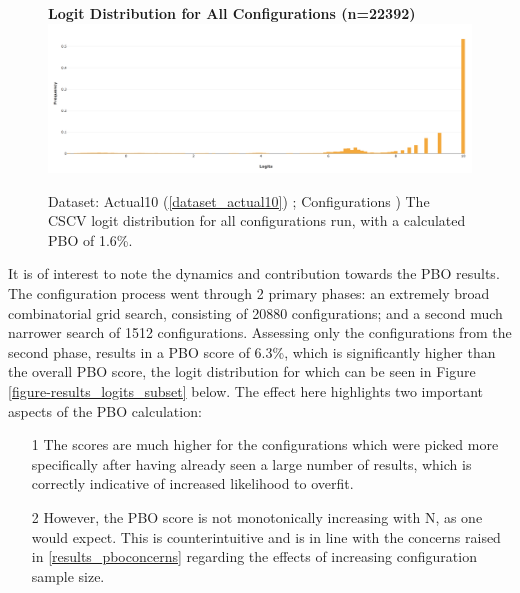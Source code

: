 \documentclass[a4paper,11pt,oneside]{article}
\theoremstyle{plain}
\theoremstyle{definition}
\begin{document}

\begin{figure}[H]
	\centering 
	\textbf{Logit Distribution for All Configurations (n=22392)}
	\includegraphics[scale=0.25]{images/results/pbo/all_sets_dist.png} 
	\caption{Dataset: Actual10 (\ref{dataset_actual10}) ; Configurations )
		\newline The CSCV logit distribution for all configurations run, with a calculated PBO of 1.6\%.}
	\label{figure-results_logits_all}
\end{figure}


It is of interest to note the dynamics and contribution towards the PBO results. The configuration process went through 2 primary phases: an extremely broad combinatorial grid search, consisting of 20880 configurations; and a second much narrower search of 1512 configurations. Assessing only the configurations from the second phase, results in a PBO score of 6.3\%, which is significantly higher than the overall PBO score, the logit distribution for which can be seen in Figure \ref{figure-results_logits_subset} below. The effect here highlights two important aspects of the PBO calculation:
\begin{itemize}
	\item[1] The scores are much higher for the configurations which were picked more specifically after having already seen a large number of results, which is correctly indicative of increased likelihood to overfit.
	\item[2] However, the PBO score is not monotonically increasing with N, as one would expect. This is counterintuitive and is in line with the concerns raised in \ref{results_pboconcerns} regarding the effects of increasing configuration sample size.
\end{itemize}
\end{document}
